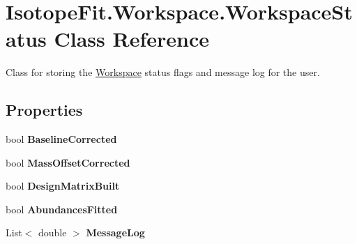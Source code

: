 \hypertarget{class_isotope_fit_1_1_workspace_1_1_workspace_status}{}\section{Isotope\+Fit.\+Workspace.\+Workspace\+Status Class Reference}
\label{class_isotope_fit_1_1_workspace_1_1_workspace_status}


Class for storing the \hyperlink{class_isotope_fit_1_1_workspace}{Workspace} status flags and message log for the user.  


\subsection*{Properties}
\begin{DoxyCompactItemize}
\item 
\mbox{\label{class_isotope_fit_1_1_workspace_1_1_workspace_status_a65fb659d552aa2c15400d40e09396229}} 
bool {\bfseries Baseline\+Corrected}
\item 
\mbox{\label{class_isotope_fit_1_1_workspace_1_1_workspace_status_a2f66d7e59cd164d2275e33ec3569eb5a}} 
bool {\bfseries Mass\+Offset\+Corrected}
\item 
\mbox{\label{class_isotope_fit_1_1_workspace_1_1_workspace_status_afa27a586f87d2d550fe9f45f0775a0f7}} 
bool {\bfseries Design\+Matrix\+Built}
\item 
\mbox{\label{class_isotope_fit_1_1_workspace_1_1_workspace_status_a15a3a16c34a8f8df6cdb7bcbc9118e53}} 
bool {\bfseries Abundances\+Fitted}
\item 
\mbox{\label{class_isotope_fit_1_1_workspace_1_1_workspace_status_aa1e34a4e9627d00e654a47aa13d44629}} 
List$<$ double $>$ {\bfseries Message\+Log}
\end{DoxyCompactItemize}


